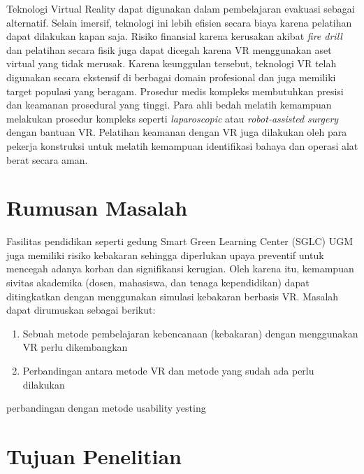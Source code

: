 Teknologi Virtual Reality dapat digunakan dalam pembelajaran evakuasi sebagai alternatif.  Selain imersif, teknologi ini lebih efisien secara biaya karena pelatihan dapat dilakukan kapan saja. Risiko finansial karena kerusakan akibat \textit{fire drill} dan pelatihan secara fisik juga dapat dicegah karena VR menggunakan aset virtual yang tidak merusak\cite{9256834}.
Karena keunggulan tersebut, teknologi VR telah digunakan secara ekstensif di berbagai domain profesional dan juga memiliki target populasi yang beragam. Prosedur medis kompleks membutuhkan presisi dan keamanan prosedural yang tinggi. Para ahli bedah melatih kemampuan melakukan prosedur kompleks seperti \textit{laparoscopic} atau \textit{robot-assisted surgery} dengan bantuan VR. Pelatihan keamanan dengan VR juga dilakukan oleh para pekerja konstruksi untuk melatih kemampuan identifikasi bahaya dan operasi alat berat secara aman\cite{Stefan2023}. 

\section{Rumusan Masalah}

Fasilitas pendidikan seperti gedung Smart Green Learning Center (SGLC) UGM juga memiliki risiko kebakaran sehingga diperlukan upaya preventif untuk mencegah adanya korban dan signifikansi kerugian. Oleh karena itu, kemampuan sivitas akademika (dosen, mahasiswa, dan tenaga kependidikan) dapat ditingkatkan dengan menggunakan simulasi kebakaran berbasis VR. Masalah dapat dirumuskan sebagai berikut:
\begin{enumerate}
	\item Sebuah metode pembelajaran kebencanaan (kebakaran) dengan menggunakan VR perlu dikembangkan
	\item Perbandingan antara metode VR dan metode yang sudah ada perlu dilakukan
\end{enumerate}


perbandingan dengan metode usability yesting



\section{Tujuan Penelitian}



